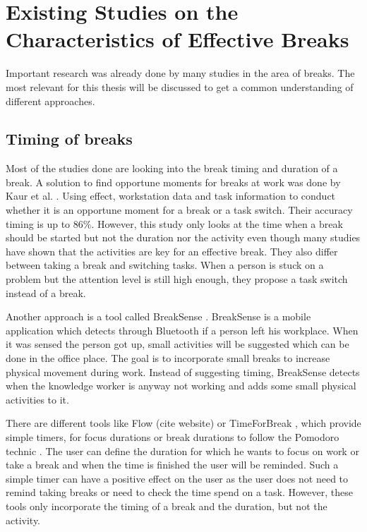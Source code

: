 \documentclass{hasel_thesis}
\begin{document}
\section{Existing Studies on the Characteristics of Effective Breaks}
Important research was already done by many studies in the area of breaks. The most relevant for this thesis will be discussed to get a common understanding of different approaches.


\subsection{Timing of breaks}
Most of the studies done are looking into the break timing and duration of a break. A solution to find opportune moments for breaks at work was done by Kaur et al. \cite{Kaur.2020}. Using effect, workstation data and task information to conduct whether it is an opportune moment for a break or a task switch. Their accuracy timing is up to 86\%. However, this study only looks at the time when a break should be started but not the duration nor the activity even though many studies have shown that the activities are key for an effective break. They also differ between taking a break and switching tasks. When a person is stuck on a problem but the attention level is still high enough, they propose a task switch instead of a break.

Another approach is a tool called BreakSense \cite{Cambo.2017}. BreakSense is a mobile application which detects through Bluetooth if a person left his workplace. When it was sensed the person got up, small activities will be suggested which can be done in the office place. The goal is to incorporate small breaks to increase physical movement during work. Instead of suggesting timing, BreakSense detects when the knowledge worker is anyway not working and adds some small physical activities to it.

There are different tools like Flow (cite website) or TimeForBreak \cite{luo.2018}, which provide simple timers, for focus durations or break durations to follow the Pomodoro technic \cite{Cirillo.2006}. The user can define the duration for which he wants to focus on work or take a break and when the time is finished the user will be reminded. Such a simple timer can have a positive effect on the user as the user does not need to remind taking breaks or need to check the time spend on a task. However, these tools only incorporate the timing of a break and the duration, but not the activity.
\end{document}
